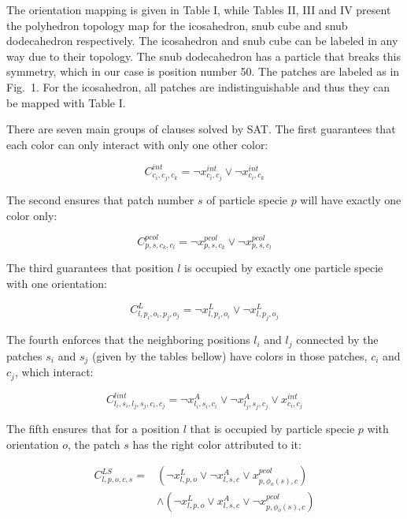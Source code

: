 \documentclass[a4paper, amsfonts, amssymb, amsmath, reprint, showkeys, nofootinbib, oneside]{revtex4-1}
\begin{document}
The orientation mapping is given in Table I, while Tables II, III and IV present the polyhedron topology map for the icosahedron, snub cube and snub dodecahedron respectively. The icosahedron and snub cube can be labeled in any way due to their topology. The snub dodecahedron has a particle that breaks this symmetry, which in our case is position number 50. The patches are labeled as in Fig.~1. For the icosahedron, all patches are indistinguishable and thus they can be mapped with Table I.

There are seven main groups of clauses solved by SAT. The first guarantees that each color can only interact with only one other color:

\begin{equation}
C^{int}_{c_i,c_j,c_k}=\neg x_{c_i,c_j}^{int} \vee \neg x_{c_i,c_k}^{int}
\end{equation}

The second ensures that patch number $s$ of particle specie $p$ will have exactly one color only:

\begin{equation}
C^{pcol}_{p,s,c_k,c_l}=\neg x_{p,s,c_k}^{pcol} \vee \neg x_{p,s,c_l}^{pcol}
\end{equation}

The third guarantees that position $l$ is occupied by exactly one particle specie with one orientation:

\begin{equation}
C^{L}_{l,p_i,o_i,p_j,o_j}=\neg x_{l,p_i,o_i}^{L} \vee \neg x_{l,p_j,o_j}^{L}
\end{equation}

The fourth enforces that the neighboring positions $l_i$ and $l_j$ connected by the patches $s_i$ and $s_j$ (given by the tables bellow) have colors in those patches, $c_i$ and $c_j$, which interact:

\begin{equation}
C^{lint}_{l_i,s_i,l_j,s_j,c_i,c_j}=\neg x_{l_i,s_i,c_i}^{A} \vee \neg x_{l_j,s_j,c_j}^{A} \vee x_{c_i,c_j}^{int}
\end{equation}

The fifth ensures that for a position $l$ that is occupied by particle specie $p$ with orientation $o$, the patch $s$ has the right color attributed to it:

\begin{equation}
\begin{split}
C^{LS}_{l,p,o,c,s}= & ( \neg x_{l,p,o}^{L} \vee \neg x_{l,s,c}^{A} \vee x_{p,\phi_o(s), c}^{pcol} ) \\ 
& \wedge ( \neg x_{l,p,o}^{L} \vee x_{l,s,c}^{A} \vee \neg x_{p,\phi_o(s), c}^{pcol} )
\end{split}
\end{equation}
\end{document}
